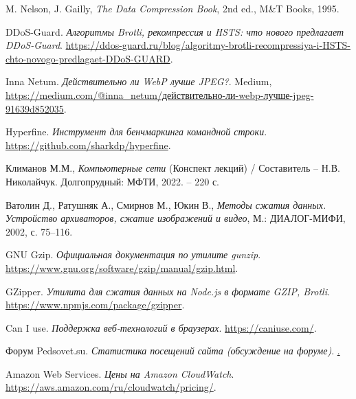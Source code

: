 \documentclass[12pt]{article}
\begin{document}
\begin{thebibliography}{9}
    M. Nelson, J. Gailly,
    \textit{The Data Compression Book},
    2nd ed., M\&T Books, 1995.

    DDoS-Guard.
    \textit{Алгоритмы Brotli, рекомпрессия и HSTS: что нового предлагает DDoS-Guard}.
    \url{https://ddos-guard.ru/blog/algoritmy-brotli-recompressiya-i-HSTS-chto-novogo-predlagaet-DDoS-GUARD}.

    Inna Netum.
    \textit{Действительно ли WebP лучше JPEG?}.
    Medium, \url{https://medium.com/@inna_netum/действительно-ли-webp-лучше-jpeg-91639d852035}.

    Hyperfine.
    \textit{Инструмент для бенчмаркинга командной строки}.
    \url{https://github.com/sharkdp/hyperfine}.

    Климанов М.М.,
    \textit{Компьютерные сети} (Конспект лекций) / Составитель – Н.В. Николайчук.
    Долгопрудный: МФТИ, 2022. – 220 с.

    Ватолин Д., Ратушняк А., Смирнов М., Юкин В.,
    \textit{Методы сжатия данных. Устройство архиваторов, сжатие изображений и видео},
    М.: ДИАЛОГ-МИФИ, 2002, с. 75--116.
	
    GNU Gzip.
    \textit{Официальная документация по утилите gunzip}.
    \url{https://www.gnu.org/software/gzip/manual/gzip.html}.

    GZipper.
    \textit{Утилита для сжатия данных на Node.js в формате GZIP, Brotli}.
    \url{https://www.npmjs.com/package/gzipper}.

    Can I use.
    \textit{Поддержка веб-технологий в браузерах}.
    \url{https://caniuse.com/}.

    Форум Pedsovet.su.
    \textit{Статистика посещений сайта (обсуждение на форуме)}.
    \href{https://pedsovet.su/forum/153-6531-3}.

    Amazon Web Services.
    \textit{Цены на Amazon CloudWatch}.
    \url{https://aws.amazon.com/ru/cloudwatch/pricing/}.
\end{thebibliography}
\end{document}
